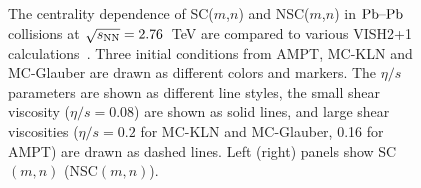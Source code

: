 \begin{figure}[!]
	\begin{center}
        \caption{The centrality dependence of SC($m$,$n$) and NSC($m$,$n$) in $\textnormal{Pb--Pb}$ collisions at $\sqrt{s_{\textnormal{NN}}}=2.76$~TeV are compared to various VISH2+1 calculations~\cite{Zhu:2016puf}. Three initial conditions from AMPT, MC-KLN and MC-Glauber are drawn as different colors and markers. The $\eta/s$ parameters are shown as different line styles, the small shear viscosity ($\eta/s=0.08$) are shown as solid lines, and large shear viscosities ($\eta/s=0.2$ for MC-KLN and MC-Glauber, 0.16 for AMPT) are drawn as dashed lines. Left (right) panels show SC$(m,n)$ (NSC$(m,n)$).}
        \label{fig:Figure_4}
        \end{center}   
 \end{figure}
 
